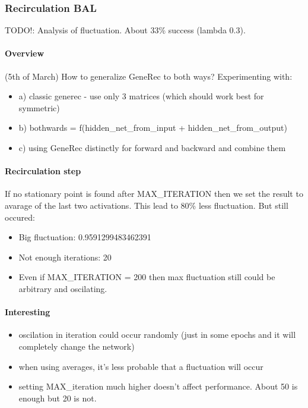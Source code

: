\subsubsection{Recirculation BAL} 
TODO!: Analysis of fluctuation. 
About 33\% success (lambda 0.3). 

\paragraph{Overview} 
(5th of March) 
How to generalize GeneRec to both ways? 
Experimenting with:
\begin{itemize} 
\item  a) classic generec - use only 3 matrices (which should work best for symmetric) 
\item  b) bothwards = f(hidden\_net\_from\_input + hidden\_net\_from\_output) 
\item  c) using GeneRec distinctly for forward and backward and combine them 
\end{itemize} 

\paragraph{Recirculation step} 
If no stationary point is found after MAX\_ITERATION then we set the result to avarage of the last two activations. This lead to 80\% less fluctuation. But still occured: 
\begin{itemize}
\item Big fluctuation: 0.9591299483462391
\item Not enough iterations: 20
\item Even if MAX\_ITERATION = 200 then max fluctuation still could be arbitrary and oscilating.
\end{itemize} 

\paragraph{Interesting} 
\begin{itemize} 
  \item oscilation in iteration could occur randomly (just in some epochs and it will completely change the network) 
  \item when using averages, it's less probable that a fluctuation will occur 
  \item setting MAX\_iteration much higher doesn't affect performance. About 50 is enough but 20 is not. 
\end{itemize} 
  
